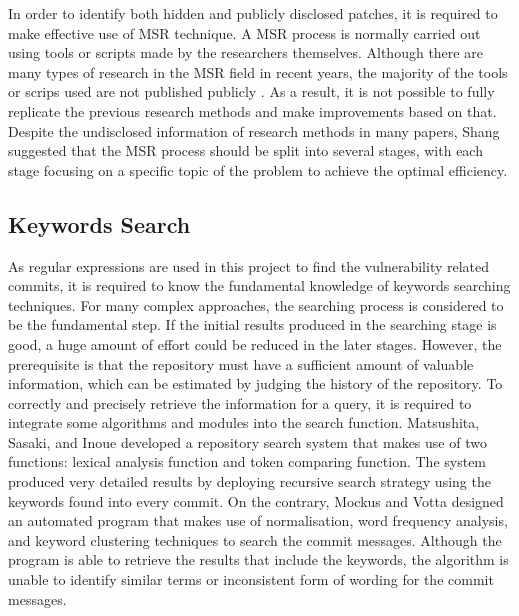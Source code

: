 \documentclass[12pt, a4paper]{report}
\begin{document}
In order to identify both hidden and publicly disclosed patches, it is required to make effective
use of MSR technique. A MSR process is normally carried out using tools or scripts made by the
researchers themselves. Although there are many types of research in the MSR field in recent years,
the majority of the tools or scrips used are not published publicly \cite{robles_2010}. As a result,
it is not possible to fully replicate the previous research methods and make improvements based on
that. Despite the undisclosed information of research methods in many papers, Shang
\cite{shang_2009} suggested that the MSR process should be split into several stages, with each
stage focusing on a specific topic of the problem to achieve the optimal efficiency.

\subsection{Keywords Search}
As regular expressions are used in this project to find the vulnerability related commits, it is
required to know the fundamental knowledge of keywords searching techniques. For many complex
approaches, the searching process is considered to be the fundamental step. If the initial results
produced in the searching stage is good, a huge amount of effort could be reduced in the later
stages. However, the prerequisite is that the repository must have a sufficient amount of valuable
information, which can be estimated by judging the history of the repository. To correctly and
precisely retrieve the information for a query, it is required to integrate some algorithms and
modules into the search function. Matsushita, Sasaki, and Inoue \cite{matsushita_2005} developed a
repository search system that makes use of two functions: lexical analysis function and token
comparing function. The system produced very detailed results by deploying recursive search strategy
using the keywords found into every commit. On the contrary, Mockus and Votta \cite{mockus_2000}
designed an automated program that makes use of normalisation, word frequency analysis, and keyword
clustering techniques to search the commit messages. Although the program is able to retrieve the
results that include the keywords, the algorithm is unable to identify similar terms or inconsistent
form of wording for the commit messages.
\end{document}

